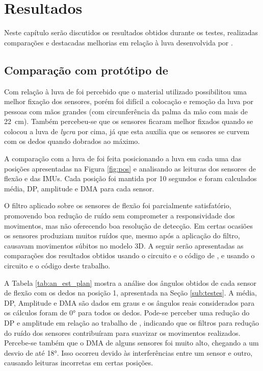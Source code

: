 \chapter{Resultados}
\label{ch:resultados}

\vspace{-1.9cm}

Neste capítulo serão discutidos os resultados obtidos durante os testes, realizadas comparações e destacadas melhorias em relação à luva desenvolvida por .

\section{Comparação com protótipo de }
\label{sec:comp}

Com relação à luva de  foi percebido que o material utilizado possibilitou uma melhor fixação dos sensores, porém foi difícil a colocação e remoção da luva por pessoas com mãos grandes (com circunferência da palma da mão com mais de \SI{22}{\centi\metre}). Também percebeu-se que os sensores ficaram melhor fixados quando se colocou a luva de \textit{lycra} por cima, já que esta auxilia que os sensores se curvem com os dedos quando dobrados ao máximo.

A comparação com a luva de  foi feita posicionando a luva em cada uma das posições apresentadas na Figura \ref{fig:pos} e analisando as leituras dos sensores de flexão e das \ac{IMU}s. Cada posição foi mantida por 10 segundos e foram calculados média, \ac{DP}, amplitude e \ac{DMA} para cada sensor.

O filtro aplicado sobre os sensores de flexão foi parcialmente satisfatório, promovendo boa redução de ruído sem comprometer a responsividade dos movimentos, mas não oferecendo boa resolução de detecção. Em certas ocasiões os sensores produziam muitos ruídos que, mesmo após a aplicação do filtro, causavam movimentos súbitos no modelo \ac{3D}. A seguir serão apresentadas as comparações dos resultados obtidos usando o circuito e o código de , e usando o circuito e o código deste trabalho.

A Tabela \ref{tab:an_est_plan} mostra a análise dos ângulos obtidos de cada sensor de flexão com os dedos na posição 1, apresentada na Seção \ref{sub:testes}. A média, \ac{DP}, Amplitude e \ac{DMA} são dados em graus e os ângulos reais considerados para os cálculos foram de \ang{0} para todos os dedos. Pode-se perceber uma redução do \ac{DP} e amplitude em relação ao trabalho de , indicando que os filtros para redução do ruído dos sensores contribuíram para suavizar os movimentos realizados. Percebe-se também que o \ac{DMA} de alguns sensores foi muito alto, chegando a um desvio de até \ang{18}. Isso ocorreu devido às interferências entre um sensor e outro, causando leituras incorretas em certas posições.

